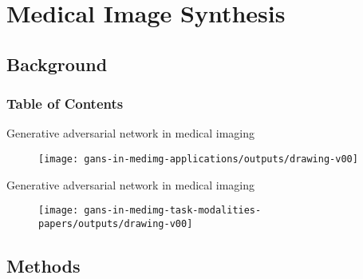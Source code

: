 
\section{Medical Image Synthesis}
\subsection{Background}
\begin{frame}
  \frametitle{Table of Contents}
  \tableofcontents[currentsection]
\end{frame}



{

\begin{frame}{Generative adversarial network in medical imaging}{}
      \begin{figure}
        \centering
        \texttt{[image: gans-in-medimg-applications/outputs/drawing-v00]}
      \end{figure}
\end{frame}
}

{

\begin{frame}{Generative adversarial network in medical imaging}{}
      \begin{figure}
        \centering
        \texttt{[image: gans-in-medimg-task-modalities-papers/outputs/drawing-v00]}
      \end{figure}
\end{frame}
}




\subsection{Methods}

